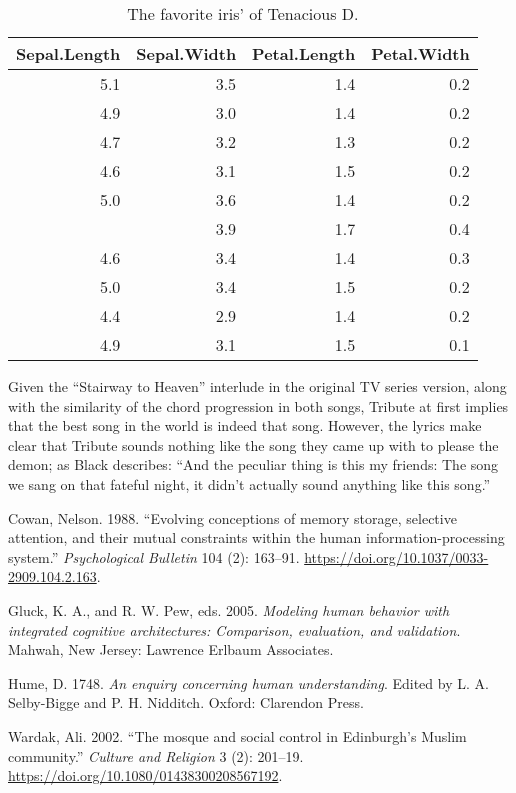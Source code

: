 \begin{table}

\caption{\label{tab:table-iris}The favorite iris' of Tenacious D.}
\centering
\begin{tabular}[t]{rrrr}
\toprule
Sepal.Length & Sepal.Width & Petal.Length & Petal.Width\\
\midrule
5.1 & 3.5 & 1.4 & 0.2\\
4.9 & 3.0 & 1.4 & 0.2\\
4.7 & 3.2 & 1.3 & 0.2\\
4.6 & 3.1 & 1.5 & 0.2\\
5.0 & 3.6 & 1.4 & 0.2\\
\addlinespace
5.4 & 3.9 & 1.7 & 0.4\\
4.6 & 3.4 & 1.4 & 0.3\\
5.0 & 3.4 & 1.5 & 0.2\\
4.4 & 2.9 & 1.4 & 0.2\\
4.9 & 3.1 & 1.5 & 0.1\\
\bottomrule
\end{tabular}
\end{table}

Given the ``Stairway to Heaven'' interlude in the original TV series
version, along with the similarity of the chord progression in both
songs, Tribute at first implies that the best song in the world is
indeed that song. However, the lyrics make clear that Tribute sounds
nothing like the song they came up with to please the demon; as Black
describes: ``And the peculiar thing is this my friends: The song we sang
on that fateful night, it didn't actually sound anything like this
song.''

\hypertarget{refs}{}
\leavevmode\hypertarget{ref-Cowan1988}{}%
Cowan, Nelson. 1988. ``Evolving conceptions of memory storage, selective
attention, and their mutual constraints within the human
information-processing system.'' \emph{Psychological Bulletin} 104 (2):
163--91. \url{https://doi.org/10.1037/0033-2909.104.2.163}.

\leavevmode\hypertarget{ref-Gluck2005}{}%
Gluck, K. A., and R. W. Pew, eds. 2005. \emph{Modeling human behavior
with integrated cognitive architectures: Comparison, evaluation, and
validation}. Mahwah, New Jersey: Lawrence Erlbaum Associates.

\leavevmode\hypertarget{ref-Hume1748}{}%
Hume, D. 1748. \emph{An enquiry concerning human understanding}. Edited
by L. A. Selby-Bigge and P. H. Nidditch. Oxford: Clarendon Press.

\leavevmode\hypertarget{ref-Wardak2002}{}%
Wardak, Ali. 2002. ``The mosque and social control in Edinburgh's Muslim
community.'' \emph{Culture and Religion} 3 (2): 201--19.
\url{https://doi.org/10.1080/01438300208567192}.


